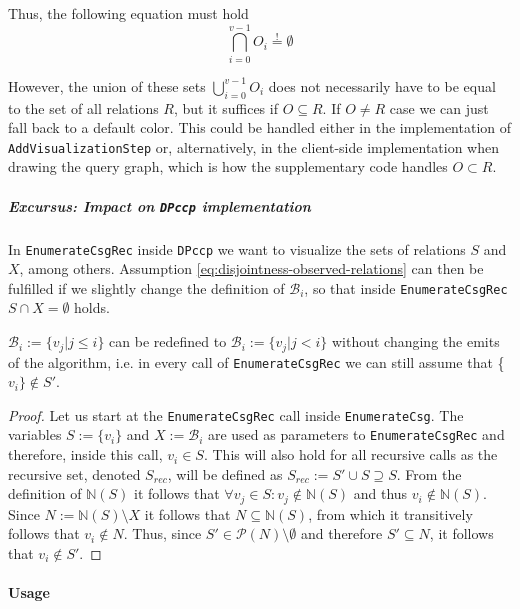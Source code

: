 Thus, the following equation must hold
\begin{equation}
\bigcap_{i=0}^{v-1}{O_i} \overset{!}{=} \emptyset
\label{eq:disjointness-observed-relations}
\end{equation}

However, the union of these sets $\bigcup_{i=0}^{v-1}{O_i}$ does not necessarily have to be equal to the set of all relations $R$, but it suffices if $O \subseteq {R}$. If $O \not= R$ case we can just fall back to a  default color. This could be handled either in the implementation of \texttt{AddVisualizationStep} or, alternatively, in the client-side implementation when drawing the query graph, which is how the supplementary code handles $O \subset R$.

\subparagraph{Excursus: Impact on \texttt{DPccp} implementation}
In \texttt{EnumerateCsgRec} inside \texttt{DPccp} we want to visualize the sets of relations $S$ and $X$, among others.  Assumption \ref{eq:disjointness-observed-relations} can then be fulfilled if we slightly change the definition of $\mathcal{B}_i$, so that inside \texttt{EnumerateCsgRec} $S \cap X = \emptyset$ holds. 

\begin{theorem}
$\mathcal{B}_i := \{v_j\vert j \leq i\}$ can be redefined to $\mathcal{B}_i := \{v_j\vert j < i\}$ without changing the emits of the algorithm, i.e. in every call of \texttt{EnumerateCsgRec} we can still assume that \{$v_i\} \notin S'$.
\end{theorem}

\begin{proof}
Let us start at the \texttt{EnumerateCsgRec} call inside \texttt{EnumerateCsg}. The variables $S := \{v_i\}$ and $X := \mathcal{B}_i$ are used as parameters to \texttt{EnumerateCsgRec} and therefore, inside this call, $v_i \in S$. This will also hold for all recursive calls as the recursive set, denoted $S_{rec}$, will be defined as  $S_{rec} := S' \cup S \supseteq S$. From the definition of $\mathbb{N}(S)$ it follows that $\forall v_j \in S \colon v_j \notin \mathbb{N}(S)$ and thus $v_i \notin \mathbb{N}(S)$. Since $N := \mathbb{N}(S)\setminus X$ it follows that $N \subseteq \mathbb{N}(S)$, from which it transitively follows that $v_i \notin N$. Thus, since $S' \in \mathcal{P}(N)\setminus\emptyset$ and therefore $S' \subseteq N$, it follows that $v_i \notin S'$.

\end{proof}

\paragraph{Usage}

